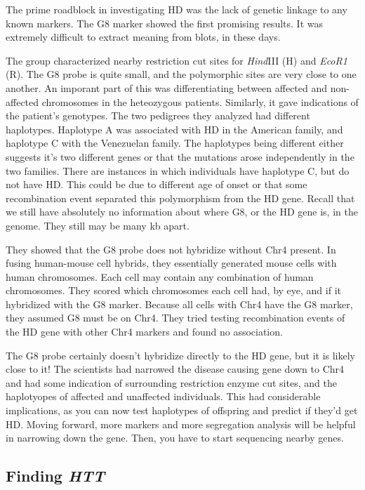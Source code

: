 The prime roadblock in investigating HD was the lack of genetic linkage to any known markers. The G8 marker showed the first promising results. It was extremely difficult to extract meaning from blots, in these days.\newline

The group characterized nearby restriction cut sites for \textit{Hind}III (H) and \textit{EcoR1} (R). The G8 probe is quite small, and the polymorphic sites are very close to one another. An imporant part of this was differentiating between  affected and non-affected chromosomes in the heteozygous patients. Similarly, it gave indications of the patient's genotypes. The two pedigrees they analyzed had different haplotypes. Haplotype A was associated with HD in the American family, and haplotype C with the Venezuelan family. The haplotypes being different either suggests it's two different genes or that the mutations arose independently in the two families. There are instances in which individuals have haplotype C, but do not have HD. This could be due to different age of onset or that some recombination event separated this polymorphism from the HD gene. Recall that we still have absolutely no information about where G8, or the HD gene is, in the genome. They still may be many kb apart. \newline

They showed that the G8 probe does not hybridize without Chr4 present. In fusing human-mouse cell hybrids, they essentially generated mouse cells with human chromosomes. Each cell may contain any combination of human chromosomes. They scored which chromosomes each cell had, by eye, and if it hybridized with the G8 marker. Because all cells with Chr4 have the G8 marker, they assumed G8 must be on Chr4. They tried testing recombination events of the HD gene with other Chr4 markers and found no association.\newline

The G8 probe certainly doesn't hybridize directly to the HD gene, but it is likely close to it! The scientists had narrowed the disease causing gene down to Chr4 and had some indication of surrounding restriction enzyme cut sites, and the haplotyopes of affected and unaffected individuals. This had considerable implications, as you can now test haplotypes of offspring and predict if they'd get HD. Moving forward, more markers and more segregation analysis will be helpful in narrowing down the gene. Then, you have to start sequencing nearby genes.  

\subsection*{Finding \textit{HTT}}

